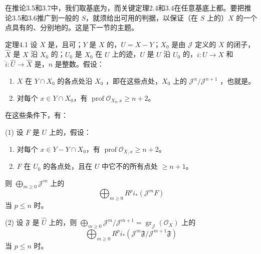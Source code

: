 在推论3.5和3.7中，我们取基底为，而关键定理2.4和3.4在任意基底上都。要把推论3.5和3.6推广到一般的 $S$，就须给出可用的判据，以保证（在 $S$ 上的）$X$ 的一个点具有的、分别地的。这是下一节的主题。

\begin{SGAresult}{定理}{4.1}
设 $X$ 是，且可；$Y$ 是 $X$ 的，$U=X-Y$；$X_0$ 是由 $\mathcal J$ 定义的 $X$ 的闭子，$\widehat X$ 是 $X$ 沿 $X_0$ 的；$U_0$ 是 $X_0$ 在 $U$ 上的迹，$\widehat U$ 是 $U$ 沿 $U_0$ 的，$i:U\to X$ 和 $\widehat i:\widehat U\to\widehat X$ 是，$n$ 是整数。假设：
\begin{enumerate}
\item[a)] $X$ 在 $Y\cap X_0$ 的各点处沿 $X_0$ ，即在这些点处，$X_0$ 上的 $\mathcal J^n/\mathcal J^{n+1}$ ，也就是。
\item[b)] 对每个 $x\in Y\cap X_0$，有 $\operatorname{prof}\mathcal O_{X_0,x}\geq n+2$。
\end{enumerate}
在这些条件下，有：

(1) 设 $F$ 是 $U$ 上的，假设：
\begin{enumerate}
\item[c)] 对每个 $x\in Y-Y\cap X_0$，有 $\operatorname{prof}\mathcal O_{X,x}\geq n+2$。
\item[d)] $F$ 在 $U_0$ 的各点处，且在 $U$ 中它不的所有点处 $\geq n+1$。
\end{enumerate}
则 $\bigoplus_{m\geq0}\mathcal J^m$ 上的
\[
 \bigoplus_{m\geq0}R^pi_*(\mathcal J^mF)
\]
当 $p\leq n$ 时。

(2) 设 $\mathfrak F$ 是 $\widehat U$ 上的，则 $\bigoplus_{m\geq0}\mathcal J^m/\mathcal J^{m+1}=\operatorname{gr}_{\mathcal J}(\mathcal O_X)$ 上的
\[
 \bigoplus_{m\geq0}R^pi_*(\mathcal J^m\mathfrak F/\mathcal J^{m+1}\mathfrak F)
\]
当 $p\leq n$ 时。
\end{SGAresult}
